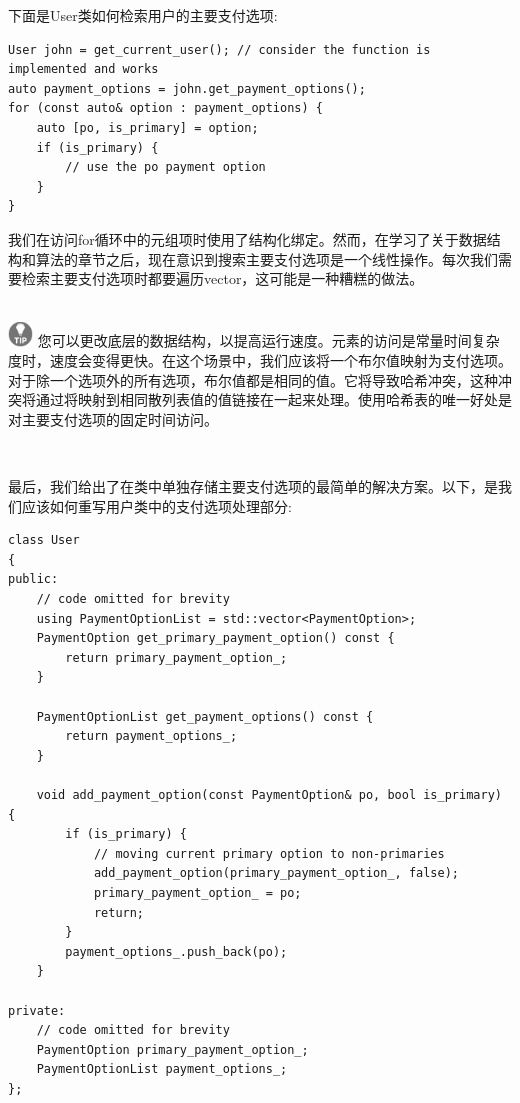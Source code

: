 下面是User类如何检索用户的主要支付选项: \par

\begin{lstlisting}[caption={}]
User john = get_current_user(); // consider the function is implemented and works
auto payment_options = john.get_payment_options();
for (const auto& option : payment_options) {
	auto [po, is_primary] = option;
	if (is_primary) {
		// use the po payment option
	}
}
\end{lstlisting}

我们在访问for循环中的元组项时使用了结构化绑定。然而，在学习了关于数据结构和算法的章节之后，现在意识到搜索主要支付选项是一个线性操作。每次我们需要检索主要支付选项时都要遍历vector，这可能是一种糟糕的做法。 \par

\hspace*{\fill} \\ %
\includegraphics[width=0.05\textwidth]{images/tip}
您可以更改底层的数据结构，以提高运行速度。元素的访问是常量时间复杂度时，速度会变得更快。在这个场景中，我们应该将一个布尔值映射为支付选项。对于除一个选项外的所有选项，布尔值都是相同的值。它将导致哈希冲突，这种冲突将通过将映射到相同散列表值的值链接在一起来处理。使用哈希表的唯一好处是对主要支付选项的固定时间访问。 \par
\noindent\textbf{}\ \par

最后，我们给出了在类中单独存储主要支付选项的最简单的解决方案。以下，是我们应该如何重写用户类中的支付选项处理部分: \par

\begin{lstlisting}[caption={}]
class User
{
public:
	// code omitted for brevity
	using PaymentOptionList = std::vector<PaymentOption>;
	PaymentOption get_primary_payment_option() const {
		return primary_payment_option_;
	}

	PaymentOptionList get_payment_options() const {
		return payment_options_;
	}

	void add_payment_option(const PaymentOption& po, bool is_primary) {
		if (is_primary) {
			// moving current primary option to non-primaries
			add_payment_option(primary_payment_option_, false);
			primary_payment_option_ = po;
			return;
		}
		payment_options_.push_back(po);
	}

private:
	// code omitted for brevity
	PaymentOption primary_payment_option_;
	PaymentOptionList payment_options_;
};
\end{lstlisting}

